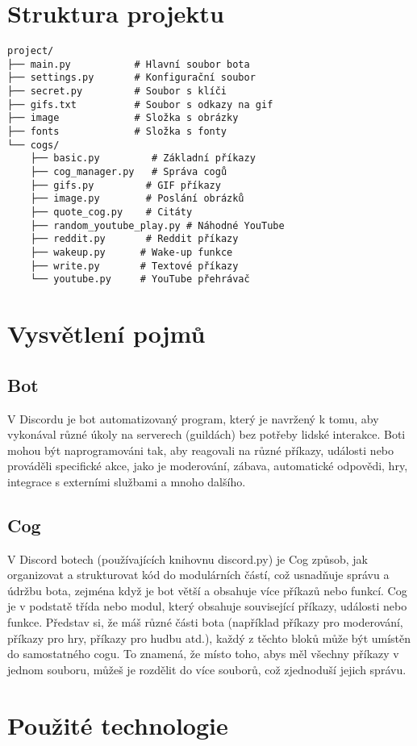 \documentclass[12pt, a4paper]{report}
\begin{document}
\section{Struktura projektu}
\begin{lstlisting}[style=Python, caption=Struktura projektu]
project/
├── main.py           # Hlavní soubor bota
├── settings.py       # Konfigurační soubor
├── secret.py         # Soubor s klíči
├── gifs.txt          # Soubor s odkazy na gif
├── image             # Složka s obrázky
├── fonts             # Složka s fonty
└── cogs/
    ├── basic.py         # Základní příkazy
    ├── cog_manager.py   # Správa cogů
    ├── gifs.py         # GIF příkazy
    ├── image.py        # Poslání obrázků
    ├── quote_cog.py    # Citáty
    ├── random_youtube_play.py # Náhodné YouTube
    ├── reddit.py       # Reddit příkazy
    ├── wakeup.py      # Wake-up funkce
    ├── write.py       # Textové příkazy
    └── youtube.py     # YouTube přehrávač
\end{lstlisting}
\section{Vysvětlení pojmů}
\subsection {Bot} V Discordu je bot automatizovaný program, který je navržený k tomu, aby vykonával různé úkoly na serverech (guildách) bez potřeby lidské interakce. Boti mohou být naprogramováni tak, aby reagovali na různé příkazy, události nebo prováděli specifické akce, jako je moderování, zábava, automatické odpovědi, hry, integrace s externími službami a mnoho dalšího.
\subsection {Cog} V Discord botech (používajících knihovnu discord.py) je Cog způsob, jak organizovat a strukturovat kód do modulárních částí, což usnadňuje správu a údržbu bota, zejména když je bot větší a obsahuje více příkazů nebo funkcí. Cog je v podstatě třída nebo modul, který obsahuje související příkazy, události nebo funkce. Představ si, že máš různé části bota (například příkazy pro moderování, příkazy pro hry, příkazy pro hudbu atd.), každý z těchto bloků může být umístěn do samostatného cogu. To znamená, že místo toho, abys měl všechny příkazy v jednom souboru, můžeš je rozdělit do více souborů, což zjednoduší jejich správu.
\section{Použité technologie}
\end{document}
